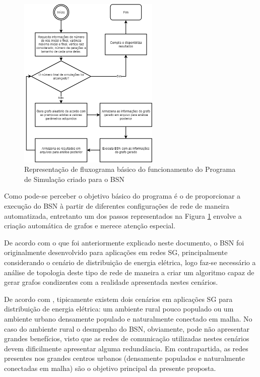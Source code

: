 \begin{figure} [ht]%
	\centering
	\includegraphics[width=0.6\textwidth]{./figuras/programa-simulacao.png}
	\caption[Fluxograma do Programa de Simulação]{Representação de fluxograma básico do funcionamento do Programa de Simulação criado para o BSN}
	\label{fig_prog_simula}
\end{figure}

Como pode-se perceber o objetivo básico do programa é o de proporcionar a execução do BSN à partir de diferentes configurações de rede de maneira automatizada, entretanto um dos passos representados na Figura \ref{fig_prog_simula} envolve a criação automática de grafos e merece atenção especial.

De acordo com o que foi anteriormente explicado neste documento, o BSN foi originalmente desenvolvido para aplicações em redes SG, principalmente considerando o cenário de distribuição de energia elétrica, logo faz-se necessário a análise de topologia deste tipo de rede de maneira a criar um algoritmo capaz de gerar grafos condizentes com a realidade apresentada nestes cenários.

De acordo com \cite{Conf-Sood2009}, tipicamente existem dois cenários em aplicações SG para distribuição de energia elétrica: um ambiente rural pouco populado ou um ambiente urbano densamente populado e naturalmente conectado em malha. No caso do ambiente rural o desmpenho do BSN, obviamente, pode não apresentar grandes benefícios, visto que as redes de comunicação utilizadas nestes cenários devem dificilmente apresentar alguma redundância. Em contrapartida, as redes presentes nos grandes centros urbanos (densamente populados e naturalmente conectadas em malha) são o objetivo principal da presente proposta.

